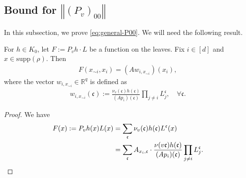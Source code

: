 \documentclass[a4paper,12pt]{article}
\theoremstyle{plain}
\theoremstyle{definition}
\def\!#1{\mathfrak{#1}} %
\def\!#1{\mathfrak{#1}} %
\newcommand{\norm}[1]{\left\Vert#1\right\Vert}
\begin{document}
\subsection{Bound for $\norm{(P_v)_{00}}$} \label{sec:general-P00}
In this subsection, we prove \eqref{eq:general-P00}.
We will need the following result.
\begin{observation} \label{obs:PvhL-on-i}
  For $h \in K_0$, let $F := P_v h \cdot L$ be a function on the leaves.
  Fix $i\in[d]$ and $x \in \mathrm{supp}(\rho)$. Then
  \begin{align*}
    F(x_{\sim i}, x_i) = (Aw_{i,x_{\sim i}})(x_i),
  \end{align*}
  where the vector $w_{i,x_{\sim i}} \in \mathbb{R}^q$ is defined as
  \begin{align*}
    w_{i,x_{\sim i}}(\!c)
    :=
    \frac{\nu_v(\!c)h(\!c)}{(Ap_i)(\!c)}
    \prod_{j\ne i}L^{\!c}_j,\quad \forall \!c.
  \end{align*}
\end{observation}
\begin{proof}
  We have
  \begin{align*}
    F(x)
    := P_vh(x)L(x) &=\sum_{\!c}\nu_v(\!c)h(\!c)L^{\!c}(x) \\
    &= \sum_{\!c} A_{x_i,\!c} \cdot \frac{\nu(v\!c)h(\!c)}{(Ap_i)(\!c)} \prod_{j\neq i} L^{\!c}_j. \qedhere
  \end{align*}
\end{proof}
\end{document}

